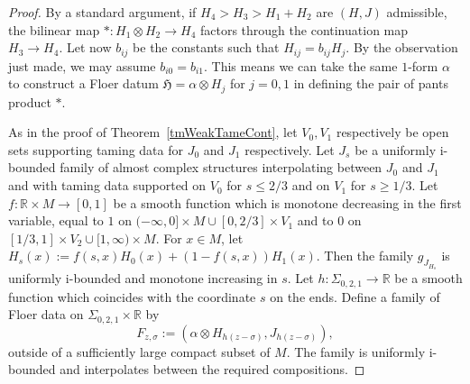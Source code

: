 \documentclass[11pt]{amsart}
\newcommand{\R}{\mathbb{R}}
\theoremstyle{definition}
\theoremstyle{remark}
\begin{document}
\begin{proof}
By a standard argument, if $H_4>H_3>H_1+H_2$ are $(H,J)$ admissible, the bilinear map $*:H_1\otimes H_2\to H_4$ factors through the continuation map $H_3\to H_4$.
Let now $b_{ij}$ be the constants such that $H_{ij}=b_{ij}H_j$. By the observation just made, we may assume $b_{i0}=b_{i1}$. This means we can take the same $1$-form $\alpha$ to construct a Floer datum $\mathfrak{H}=\alpha\otimes H_j$ for $j=0,1$ in defining the pair of pants product $*$.

As in the proof of Theorem~\ref{tmWeakTameCont}, let $V_0,V_1$ respectively be open sets supporting taming data for $J_0$ and $J_1$ respectively. Let $J_s$ be a uniformly i-bounded family of almost complex structures interpolating between $J_0$ and $J_1$ and with taming data supported on $V_0$ for $s\leq 2/3$ and on $V_1$ for $s\geq 1/3$. Let $f:\R\times M \to [0,1]$ be a smooth function which is monotone decreasing in the first variable,  equal to $1$ on $(-\infty,0]\times M\cup [0,2/3]\times V_1$ and to $0$ on $[1/3,1]\times V_2\cup [1,\infty)\times M$. For $x\in M$, let $H_s(x):=f(s,x)H_0(x)+(1-f(s,x))H_1(x)$.  Then the family $g_{J_{H_s}}$ is uniformly i-bounded and monotone increasing in $s$. Let $h:\Sigma_{0,2,1}\to\R$ be a smooth function which coincides with the coordinate $s$ on the ends. Define a family of Floer data on $\Sigma_{0,2,1}\times\R$ by
\[
F_{z,\sigma}:= \left(\alpha\otimes H_{h(z-\sigma)},J_{h(z-\sigma)}\right),
\]
outside of a sufficiently large compact subset of $M$. The family is uniformly i-bounded and interpolates between the required compositions.
\end{proof}
\end{document}
